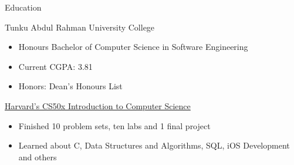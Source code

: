 \documentclass{article}
\newlength{\tabin}
\newlength{\secsep}
\newcommand{\lineunder}{\vspace*{-8pt} \\ \hspace*{-6pt} \hrulefill \\ \vspace*{-15pt}}
\newenvironment{tabbedsection}[1]{
  \begin{list}{}{
      \setlength{\itemsep}{0pt}
      \setlength{\labelsep}{0pt}
      \setlength{\labelwidth}{0pt}
      \setlength{\leftmargin}{\tabin}
      \setlength{\rightmargin}{\tabin}
      \setlength{\listparindent}{0pt}
      \setlength{\parsep}{0pt}
      \setlength{\parskip}{0pt}
      \setlength{\partopsep}{0pt}
      \setlength{\topsep}{#1}
    }
  \item[]
}{\end{list}}
\newenvironment{resume_section}[1]{
  \filbreak
  \vspace{2\secsep}
  \textsc{\large#1}
  \lineunder
  \begin{tabbedsection}{\secsep}
}{\end{tabbedsection}}
\newenvironment{resume_subsection}[2][]{
  \textbf{#2} \hfill {\footnotesize #1} \hspace{2em}
  \begin{tabbedsection}{0.5\secsep}
}{\end{tabbedsection}}
\newenvironment{subitems}{
  \renewcommand{\labelitemi}{-}
  \begin{itemize}
      \setlength{\labelsep}{1em}
}{\end{itemize}}
\begin{document}
\begin{resume_section}{Education}
  \begin{resume_subsection}{Tunku Abdul Rahman University College}
    \begin{subitems}
      \item Honours Bachelor of Computer Science in Software Engineering
      \item Current CGPA: 3.81
      \item Honors: Dean's Honours List
    \end{subitems}
  \end{resume_subsection}

  \begin{resume_subsection}[Online (2020--2021)]{\href{https://drive.google.com/file/d/1-tVq-vD20YwCcI3YgotgKKe_UYvHTwBj/view?usp=sharing}{Harvard's CS50x Introduction to Computer Science}}
    \begin{subitems}
      \item Finished 10 problem sets, ten labs and 1 final project
      \item Learned about C, Data Structures and Algorithms, SQL, iOS Development and others
    \end{subitems}
  \end{resume_subsection}
\end{resume_section}
\end{document}
